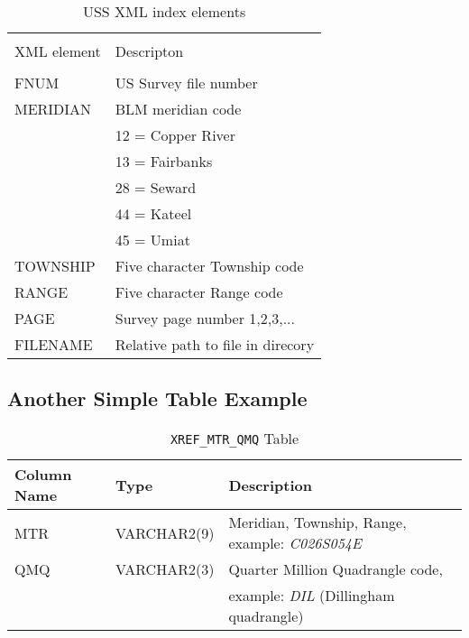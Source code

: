 \documentclass[12pt,letterpaper,dvips]{article}
\newcommand{\cmd}[1]{\texttt{#1}}
\begin{document}
\begin{table}[htb]
\begin{center}
\begin{tabular*}{\textwidth}{@{}p{}@{}p{}}
\hline
\hline\\[-2.5ex]
XML element&Descripton\\
\hline
\hline\\[-1.5ex]   %
FNUM&US Survey file number\\ 
MERIDIAN&BLM meridian code\\
&\hspace{10pt}12 = Copper River\\
&\hspace{10pt}13 = Fairbanks\\
&\hspace{10pt}28 = Seward\\
&\hspace{10pt}44 = Kateel\\
&\hspace{10pt}45 = Umiat\\
TOWNSHIP&Five character Township code\\
RANGE&Five character Range code\\
PAGE&Survey page number 1,2,3,...\\
FILENAME&Relative path to file in direcory\\[1.5ex]
\hline
\end{tabular*}
\caption {USS XML index elements}
\label{table:uss-index}
\end{center}
\end{table}


\subsection{Another Simple Table Example}
\begin{table}[htb]
\begin{tabular}{|p{}|p{}|p{}|}\hline 
Column Name&Type&Description\\ 
\hline
MTR&VARCHAR2(9)&Meridian, Township, Range, example: \emph{C026S054E}\\
QMQ&VARCHAR2(3)&Quarter Million Quadrangle code,\\
&&\hspace{10pt}example: \emph{DIL} (Dillingham quadrangle)\\
\hline
\end{tabular}
\caption {\cmd{XREF\_MTR\_QMQ} Table}
\label{table:xref_mtr_qmq}
\end{table}
\end{document}
